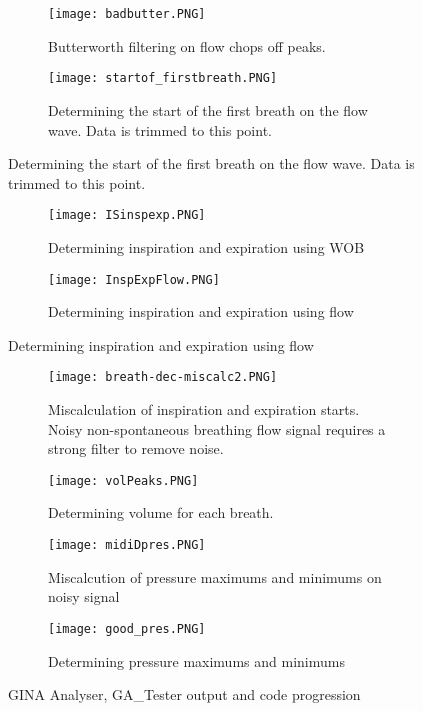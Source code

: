 \documentclass[12pt, openany, oneside]{book}
\begin{document}

\begin{figure}[H]
	\begin{subfigure}[t]{0.49\textwidth}
		\centering
		\texttt{[image: badbutter.PNG]}		
		\caption{Butterworth filtering on flow chops off peaks.}
		\label{fig:badbutter}
	\end{subfigure}%
	\hfill
	\begin{subfigure}[t]{0.49\textwidth}
		\centering
		\texttt{[image: startof\_firstbreath.PNG]}		
		\caption[Determining the start of the first breath on the flow wave]{Determining the start of the first breath on the flow wave. Data is trimmed to this point.}
		\label{fig:startbreath}
	\end{subfigure}
\end{figure}
\begin{figure}\ContinuedFloat
	\begin{subfigure}[t]{0.49\textwidth}
		\centering
		\texttt{[image: ISinspexp.PNG]}		
		\caption{Determining inspiration and expiration using WOB}
		\label{fig:WOBcalc}
	\end{subfigure}%
	\hfill
	\begin{subfigure}[t]{0.49\textwidth}
		\centering
		\texttt{[image: InspExpFlow.PNG]}		
		\caption{Determining inspiration and expiration using flow}
		\label{fig:flowCalc}
	\end{subfigure}
\end{figure}

\begin{figure}\ContinuedFloat
	\begin{subfigure}[H]{0.49\textwidth}
		\centering
		\texttt{[image: breath-dec-miscalc2.PNG]}		
		\caption[Miscalculation of inspiration and expiration starts.]{Miscalculation of inspiration and expiration starts. Noisy non-spontaneous breathing flow signal requires a strong filter to remove noise.}
		\label{fig:miscalc}
	\end{subfigure}%
	\hfill
\begin{subfigure}[H]{0.49\textwidth}
		\centering
		\texttt{[image: volPeaks.PNG]}		
		\caption{Determining volume for each breath.}
		\label{fig:volP}
	\end{subfigure}	
	\medskip
	\begin{subfigure}[H]{0.49\textwidth}
		\centering
		\texttt{[image: midiDpres.PNG]}		
		\caption{Miscalcution of pressure maximums and minimums on noisy signal}
		\label{fig:pMM}
	\end{subfigure}%
	\hfill
	\begin{subfigure}[H]{0.49\textwidth}
		\centering
		\texttt{[image: good\_pres.PNG]}		
		\caption{Determining pressure maximums and minimums}
		\label{fig:goodpres}
	\end{subfigure}

\caption{GINA Analyser, GA\_Tester output and code progression}
\end{figure}
\end{document}
